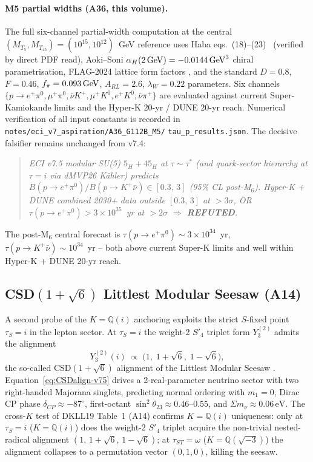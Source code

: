 \documentclass[a4paper,11pt]{article}
\newcommand{\Spf}{S'_4}
\newcommand{\Qi}{\mathbb{Q}(i)}
\theoremstyle{definition}
\theoremstyle{remark}
\begin{document}
\paragraph{M5 partial widths (A36, this volume).}  The full
six-channel partial-width computation at the central
$(M_{T_5},M_{T_{45}}) = (10^{15},10^{12})$~GeV reference uses
Haba eqs.~(18)--(23)~\cite{HabaNagShim24} (verified by direct PDF
read), Aoki--Soni $\alpha_H(2\,{\rm GeV})=-0.0144\,{\rm GeV}^3$
chiral parametrisation, FLAG-2024 lattice form factors
\cite{FLAG24}, and the standard $D=0.8$, $F=0.46$,
$f_\pi=0.093\,{\rm GeV}$, $A_{RL}=2.6$, $\lambda_W=0.22$
parameters.  Six channels $\{p\to e^+\pi^0,\mu^+\pi^0,
\bar\nu K^+,\mu^+ K^0,e^+ K^0,\bar\nu\pi^+\}$ are evaluated
against current Super-Kamiokande limits
\cite{SuperK20epi,SuperK14Knu} and the Hyper-K 20-yr
\cite{HK18} / DUNE 20-yr \cite{DUNE24} reach.  Numerical
verification of all input constants is recorded in
\texttt{notes/eci\_v7\_aspiration/A36\_G112B\_M5/}
\texttt{tau\_p\_results.json}.  The decisive falsifier remains
unchanged from v7.4:
\begin{quote}\itshape
ECI v7.5 modular SU(5) $5_H+45_H$ at $\tau\sim\tau^{*}$ (and
quark-sector hierarchy at $\tau=i$ via dMVP26 K\"ahler) predicts
$B(p\to e^+\pi^0)/B(p\to K^+\bar\nu)\in[0.3,\,3]$ (95\% CL
post-M$_6$).  Hyper-K + DUNE combined 2030+ data outside
$[0.3,\,3]$ at $>3\sigma$, OR
$\tau(p\to e^+\pi^0)>3\times 10^{35}$~yr at $>2\sigma$
$\Rightarrow$ \textbf{REFUTED}.
\end{quote}
The post-M$_6$ central forecast is
$\tau(p\to e^+\pi^0)\sim 3\times 10^{34}$~yr,
$\tau(p\to K^+\bar\nu)\sim 10^{34}$~yr -- both above current
Super-K limits and well within Hyper-K + DUNE 20-yr reach.

\subsection{CSD$(1+\sqrt 6)$ Littlest Modular Seesaw (A14)}
\label{sec:CSD}

A second probe of the $K=\Qi$ anchoring exploits the strict
$S$-fixed point $\tau_S=i$ in the lepton sector.  At
$\tau_S=i$ the weight-2 $\Spf$ triplet form $Y_3^{(2)}$ admits
the alignment
\begin{equation}
\label{eq:CSDalign-v75}
  Y_3^{(2)}(i) \;\propto\; \bigl(1,\;1+\sqrt{6},\;1-\sqrt{6}\bigr),
\end{equation}
the so-called CSD$(1+\sqrt{6})$ alignment of the Littlest Modular
Seesaw \cite{DKLL19,LMS22}.  Equation~\eqref{eq:CSDalign-v75}
drives a 2-real-parameter neutrino sector with two right-handed
Majorana singlets, predicting normal ordering with $m_1=0$,
Dirac CP phase $\delta_{CP}\approx -87^{\circ}$, first-octant
$\sin^2\theta_{23}\approx 0.46$--$0.55$, and
$\Sigma m_\nu\approx 0.06\,\mathrm{eV}$.  The cross-$K$ test of
DKLL19 Table~1 (A14) confirms $K=\Qi$ uniqueness: only at
$\tau_S=i$ ($K=\Qi$) does the weight-2 $\Spf$ triplet acquire
the non-trivial nested-radical alignment $(1,\,1+\sqrt 6,\,
1-\sqrt 6)$; at $\tau_{ST}=\omega$ ($K=\mathbb{Q}(\sqrt{-3})$)
the alignment collapses to a permutation vector $(0,1,0)$,
killing the seesaw.
\end{document}
